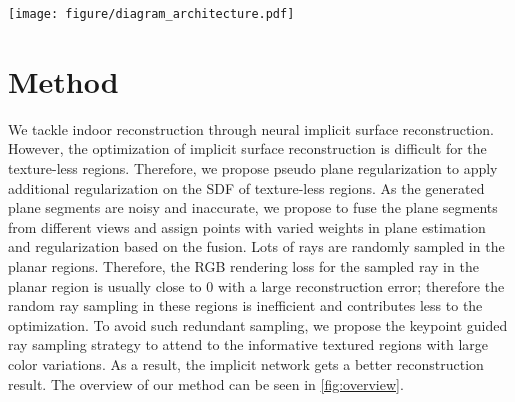 \documentclass[10pt,journal,compsoc]{IEEEtran}
\begin{document}
	\begin{figure*}[htbp]
		\centering
		\texttt{[image: figure/diagram\_architecture.pdf]}
		\caption{The overview of our method. We utilize the DSO method to extract keypoints and then calculate the ray sampling weight to guide the sampling. We learn the appearance, signed distance, depth, and segments of 3D scenes with implicit neural representations. For each ray, we use differentiable volume rendering to render its pixel color, depth, and segment probabilities, which are supervised with the input image, sparse depth obtained by COLMAP, and plane segments in 2D by super-pixel, respectively. We propose the novel plane regularization by a two-step plane parameter estimation strategy, which improves the smoothness in planar regions and details in the non-planar parts. We calculate rough plane parameters according to the accumulated depth of the sampled points and resample more points to compute the rectified plane parameters according to the signed distances and the normal directions. To overcome noisy and inaccurate plane segments, we additionally introduce plane segments fusion strategy to weight the points in the second rectified plane estimation step and the plane regularization.}
		\label{fig:overview}
	\end{figure*}
	
	\section{Method}
	\label{sec:method}
	We tackle indoor reconstruction through neural implicit surface reconstruction. However, the optimization of implicit surface reconstruction is difficult for the texture-less regions. Therefore, we propose pseudo plane regularization to apply additional regularization on the SDF of texture-less regions. As the generated plane segments are noisy and inaccurate, we propose to fuse the plane segments from different views and assign points with varied weights in plane estimation and regularization based on the fusion. Lots of rays are randomly sampled in the planar regions. Therefore, the RGB rendering loss for the sampled ray in the planar region is usually close to 0 with a large reconstruction error; therefore the random ray sampling in these regions is inefficient and contributes less to the optimization. To avoid such redundant sampling, we propose the keypoint guided ray sampling strategy to attend to the informative textured regions with large color variations. As a result, the implicit network gets a better reconstruction result. The overview of our method can be seen in \cref{fig:overview}.
\end{document}
